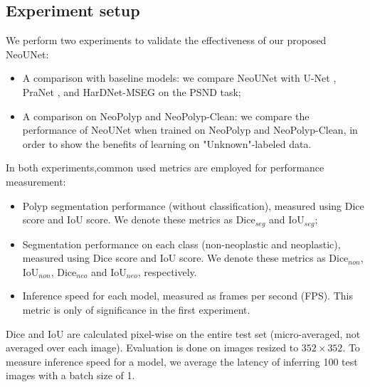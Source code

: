 \documentclass[runningheads]{llncs}
\newcommand{\ModelName}{NeoUNet\xspace}
\newcommand{\DatasetName}{NeoPolyp\xspace}
\newcommand{\CleanDatasetName}{NeoPolyp-Clean\xspace}
\begin{document}
	\subsection{Experiment setup}
	We perform two experiments to validate the effectiveness of our proposed \ModelName:
	\begin{itemize}
		\item A comparison with baseline models: we compare \ModelName with U-Net \cite{ronneberger2015u}, PraNet \cite{fan2020pranet}, and HarDNet-MSEG \cite{huang2021hardnet} on the PSND task;
		\item A comparison on \DatasetName and \CleanDatasetName{}: we compare the performance of \ModelName when trained on \DatasetName and \CleanDatasetName{}, in order to show the benefits of learning on "Unknown"-labeled data.
	\end{itemize}

	In both experiments,common used metrics are employed for performance measurement:
	\begin{itemize}
		\item Polyp segmentation performance (without classification), measured using Dice score and IoU score. We denote these metrics as $\text{Dice}_{seg}$ and $\text{IoU}_{seg}$;
		\item Segmentation performance on each class (non-neoplastic and neoplastic), measured using Dice score and IoU score. We denote these metrics as $\text{Dice}_{non}$, $\text{IoU}_{non}$, $\text{Dice}_{neo}$ and $\text{IoU}_{neo}$, respectively.
		\item Inference speed for each model, measured as frames per second (FPS). This metric is only of significance in the first experiment.
	\end{itemize}

	Dice and IoU are calculated pixel-wise on the entire test set (micro-averaged, not averaged over each image). Evaluation is done on images resized to $352 \times 352$. To measure inference speed for a model, we average the latency of inferring 100 test images with a batch size of 1.
\end{document}
